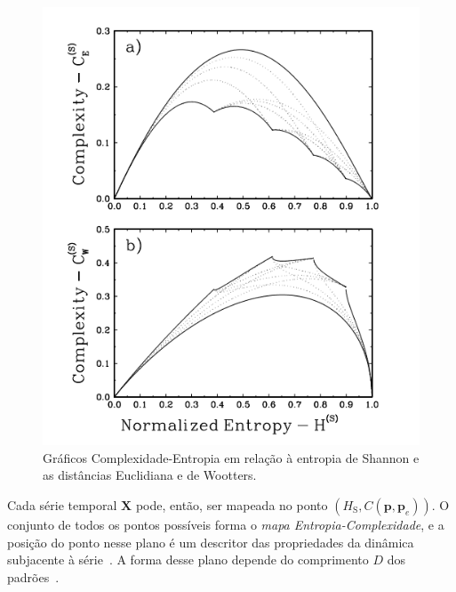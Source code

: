 \begin{figure}[!hbt]
	\begin{center}
		\includegraphics[width=0.6\columnwidth]{capitulos/imagens/graficoComplexidade.png}
        \caption{Gráficos Complexidade-Entropia em relação à entropia de Shannon e as distâncias Euclidiana e de Wootters.}
	\end{center}
\end{figure}
 
Cada série temporal $\bm X$ pode, então, ser mapeada no ponto $(H_{\text{S}}, C(\bm p, \bm p_e))$.
O conjunto de todos os pontos possíveis forma o \textit{mapa Entropia-Complexidade}, e a posição do ponto nesse plano é um descritor das propriedades da dinâmica subjacente à série~\citep{OrdinalPatternProbabilities}.
A forma desse plano depende do comprimento $D$ dos padrões~\citep{MARTIN2006439}.
